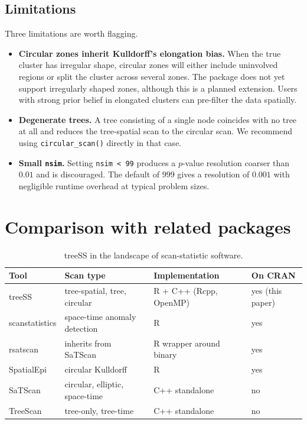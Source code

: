 \hypertarget{limitations}{%
\subsection{Limitations}\label{limitations}}

Three limitations are worth flagging.

\begin{itemize}
\tightlist
\item
  \textbf{Circular zones inherit Kulldorff's elongation bias.} When the true
  cluster has irregular shape, circular zones will either include
  uninvolved regions or split the cluster across several zones. The
  package does not yet support irregularly shaped zones, although this
  is a planned extension. Users with strong prior belief in elongated
  clusters can pre-filter the data spatially.
\item
  \textbf{Degenerate trees.} A tree consisting of a single node coincides with
  no tree at all and reduces the tree-spatial scan to the circular scan.
  We recommend using \texttt{circular\_scan()} directly in that case.
\item
  \textbf{Small \texttt{nsim}.} Setting \texttt{nsim\ \textless{}\ 99} produces a \(p\)-value resolution
  coarser than \(0.01\) and is discouraged. The default of \(999\) gives a
  resolution of \(0.001\) with negligible runtime overhead at typical
  problem sizes.
\end{itemize}

\hypertarget{sec-comparison}{%
\section{Comparison with related packages}\label{sec-comparison}}

\begin{table}

\caption{\label{tab:related}treeSS in the landscape of scan-statistic software.}
\centering
\begin{tabular}[t]{llll}
\toprule
Tool & Scan type & Implementation & On CRAN\\
\midrule
treeSS & tree-spatial, tree, circular & R + C++ (Rcpp, OpenMP) & yes (this paper)\\
scanstatistics & space-time anomaly detection & R & yes\\
rsatscan & inherits from SaTScan & R wrapper around binary & yes\\
SpatialEpi & circular Kulldorff & R & yes\\
SaTScan & circular, elliptic, space-time & C++ standalone & no\\
\addlinespace
TreeScan & tree-only, tree-time & C++ standalone & no\\
\bottomrule
\end{tabular}
\end{table}

